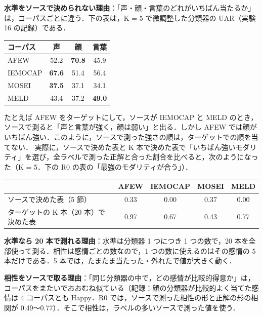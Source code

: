 \documentclass[a4paper,11pt]{ltjsarticle}
\begin{document}
\noindent\textbf{水準をソースで決められない理由}：「声・顔・言葉のどれがいちばん当たるか」は，コーパスごとに違う．下の表は，K = 5 で微調整した分類器の UAR（実験 16 の記録）である．
\begin{center}
\small
\begin{tabular}{lccc}
\toprule
コーパス & 声 & 顔 & 言葉 \\
\midrule
AFEW & 52.2 & \textbf{70.8} & 45.9 \\
IEMOCAP & \textbf{67.6} & 51.4 & 56.4 \\
MOSEI & \textbf{37.5} & 37.1 & 34.1 \\
MELD & 43.4 & 37.2 & \textbf{49.0} \\
\bottomrule
\end{tabular}
\end{center}
たとえば AFEW をターゲットにして，ソースが IEMOCAP と MELD のとき，ソースで測ると「声と言葉が強く，顔は弱い」と出る．しかし AFEW では顔がいちばん強い．このように，ソースで測った強さの順は，ターゲットでの順を当てない．
実際に，ソースで決めた表と K 本で決めた表で「いちばん強いモダリティ」を選び，全ラベルで測った正解と合った割合を比べると，次のようになった（K = 5．下の R0 の表の「最強のモダリティが合う」）．
\begin{center}
\small
\begin{tabular}{lcccc}
\toprule
 & AFEW & IEMOCAP & MOSEI & MELD \\
\midrule
ソースで決めた表（5 節） & 0.33 & 0.00 & 0.37 & 0.00 \\
ターゲットの K 本（20 本）で決めた表 & 0.97 & 0.67 & 0.43 & 0.77 \\
\bottomrule
\end{tabular}
\end{center}

\noindent\textbf{水準なら 20 本で測れる理由}：水準は分類器 1 つにつき 1 つの数で，20 本を全部使って測る．相性は感情ごとの数なので，1 つの数に使えるのはその感情の 5 本だけである．5 本では，たまたま当たった・外れたで値が大きく動く．

\noindent\textbf{相性をソースで取る理由}：「同じ分類器の中で，どの感情が比較的得意か」は，コーパスをまたいでおおむね似ている（記録：顔の分類器が比較的よく当てた感情は 4 コーパスとも Happy．R0 では，ソースで測った相性の形と正解の形の相関が 0.49〜0.77）．そこで相性は，ラベルの多いソースで測った値を使う．
\end{document}
